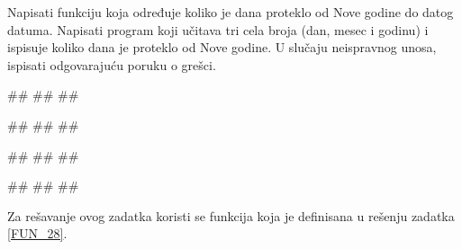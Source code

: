 \begin{Exercise}[label=FUN_26] 
Napisati funkciju  koja određuje koliko je dana proteklo od Nove godine do
datog datuma. Napisati program koji učitava tri cela broja (dan, mesec i godinu) i ispisuje
koliko dana je proteklo od Nove godine. 
U slučaju neispravnog unosa, ispisati odgovarajuću poruku o grešci. 

\begin{miditest}
\begin{upotreba}{1}
#\naslovInt#
##
##
\end{upotreba}
\end{miditest}
\begin{miditest}
\begin{upotreba}{2}
#\naslovInt#
##
##
\end{upotreba}
\end{miditest}

\begin{miditest}
\begin{upotreba}{3}
#\naslovInt#
##
##
\end{upotreba}
\end{miditest}
\begin{miditest}
\begin{upotreba}{4}
#\naslovInt#
##
##
\end{upotreba}
\end{miditest}

\end{Exercise}
\ifresenja 
\begin{Answer}[ref=FUN_26]

Za rešavanje ovog zadatka koristi se funkcija  koja je definisana u rešenju zadatka \ref{FUN_28}.
\end{Answer} 
\fi


